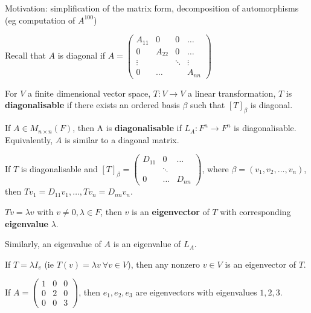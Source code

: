 \documentclass[11pt]{scrartcl}
\begin{document}
Motivation: simplification of the matrix form, decomposition of automorphisms (eg computation of \(A^{100}\))

Recall that \(A\) is diagonal if \(A = \begin{pmatrix}
  A_{11} & 0 & 0 & \dots\\
  0 & A_{22} & 0 & \dots\\
  \vdots & &\ddots & \vdots\\
  0& \dots & &  A_{nn}
\end{pmatrix}\)

\begin{definition}
  For \(V\) a finite dimensional vector space, \(T: V\to V\) a linear
  transformation, \(T\) is \textbf{diagonalisable} if there exists an ordered
  basis \(\beta\) such that \([T]_{\beta}\) is diagonal.

  If \(A\in M_{n\times n}(F)\), then A is \textbf{diagonalisable} if
  \(L_{A}: F^{n} \to F^{n}\) is diagonalisable. Equivalently, \(A\) is
  similar to a diagonal matrix.
\end{definition}

If \(T\) is diagonalisable and \([T]_{\beta} = \begin{pmatrix}
  D_{11} & 0 & \dots \\
  & \ddots & \\
  0 & \dots & D_{nn}
\end{pmatrix}\), where \(\beta = (v_{1}, v_{2}, \dots, v_{n})\), then
\(Tv_{1} = D_{11}v_{1}, \dots,Tv_{n} =D_{nn}v_{n}\).

\begin{definition}
  \(Tv = \lambda v\) with \(v\neq 0, \lambda \in F\), then \(v\) is an
  \textbf{eigenvector} of \(T\) with corresponding \textbf{eigenvalue}
  \(\lambda\).

  Similarly, an eigenvalue of \(A\) is an eigenvalue of \(L_{A}\).
\end{definition}

\begin{example}
  If \(T=\lambda I_{v}\) (ie \(T(v) = \lambda v\  \forall v \in V\)),
  then any nonzero \(v\in V\) is an eigenvector of \(T\).
\end{example}
\begin{example}
  If \(A = \begin{pmatrix}
    1 & 0 & 0\\
    0 & 2 & 0\\
    0 & 0 & 3
  \end{pmatrix}\), then \(e_{1}, e_{2},e_{3}\) are eigenvectors with
eigenvalues \(1, 2, 3\).
\end{example}
\end{document}
